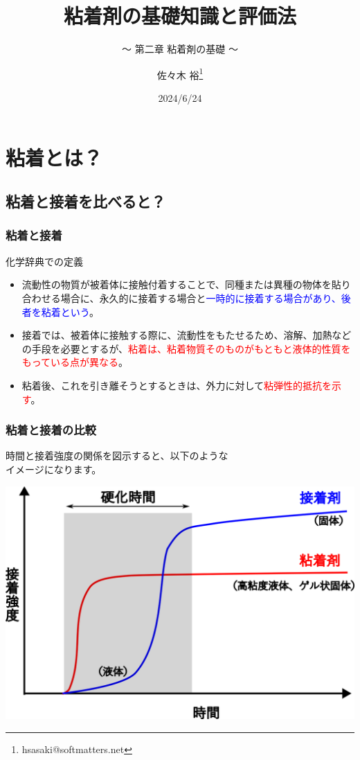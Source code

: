 \documentclass[unicode,12pt]{beamer}%
\title{粘着剤の基礎知識と評価法}
\subtitle{～ 第二章 粘着剤の基礎 ～}
\author[SDL Inc. 佐々木]{佐々木 裕\thanks{hsasaki@softmatters.net}}
\institute[]{元 東亞合成株式会社\\ソフトマターデザインラボ合同会社}
\date{2024/6/24}
\begin{document}
\maketitle

\begin{frame} 
    \tableofcontents[]
\end{frame} 


\section{粘着とは？}
\subsection{粘着と接着を比べると？}
\begin{frame}
	\frametitle{粘着と接着}
		\begin{block}{化学辞典での定義}
			\begin{itemize}
				\item 流動性の物質が被着体に接触付着することで、同種または異種の物体を貼り合わせる場合に、永久的に接着する場合と\textcolor{blue}{一時的に接着する場合があり、後者を粘着という}。
				\item 接着では、被着体に接触する際に、流動性をもたせるため、溶解、加熱などの手段を必要とするが、\textcolor{red}{粘着は、粘着物質そのものがもともと液体的性質をもっている点が異なる}。
				\item 粘着後、これを引き離そうとするときは、外力に対して\textcolor{red}{粘弾性的抵抗を示す}。
			\end{itemize}
		\end{block}
\end{frame}

\begin{frame}
	\frametitle{粘着と接着の比較}
		時間と接着強度の関係を図示すると、以下のような\\イメージになります。

		\vspace{5mm}
			\centering
				\includegraphics[width=.8\textwidth]{../fig/adh_psa.png}
		
\end{frame}
\end{document}
